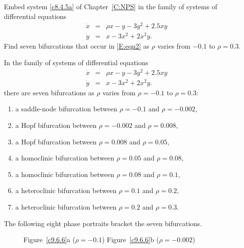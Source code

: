 \documentclass{ximera}
\begin{document}
\begin{exercise} \label{c9.6.6}
Embed system \eqref{c8.4.5a} of Chapter~\ref{C:NPS} in the family of systems of 
differential equations 
\begin{equation} \label{E:eqn2}
\begin{array}{rcl}
\dot{x} & = & \rho x-y-3y^2+2.5xy\\
\dot{y} & = & x-3x^2+2x^2y.
\end{array}
\end{equation}
Find seven bifurcations that occur in \eqref{E:eqn2} as $\rho$ varies from 
$-0.1$ to $\rho=0.3$. 

\begin{solution}

\soln In the family of systems of differential equations  
\[
\begin{array}{rcl}
\dot{x} & = & \rho x-y-3y^2+2.5xy\\
\dot{y} & = & x-3x^2+2x^2y.
\end{array}
\]
there are seven bifurcations as $\rho$ varies from $\rho=-0.1$ to $\rho=0.3$:  
\begin{enumerate}
\item	a saddle-node bifurcation between $\rho=-0.1$ and $\rho=-0.002$,
\item	a Hopf bifurcation between $\rho=-0.002$ and $\rho=0.008$,
\item	a Hopf bifurcation between $\rho=0.008$ and $\rho=0.05$,
\item	a homoclinic bifurcation between $\rho=0.05$ and $\rho=0.08$,
\item	a homoclinic bifurcation between $\rho=0.08$ and $\rho=0.1$,
\item	a heteroclinic bifurcation between $\rho=0.1$ and $\rho=0.2$,
\item	a heteroclinic bifurcation between $\rho=0.2$ and $\rho=0.3$.
\end{enumerate}
The following eight phase portraits bracket the seven bifurcations.
\begin{figure}[htb]
     \centerline{%
     }
     \centerline{Figure~\ref{c9.6.6}a ($\rho = -0.1$)\hspace{1.3in} Figure~\ref{c9.6.6}b ($\rho = -0.002$)}
\end{figure}
\begin{figure}[htb]
     \centerline{%
     }

\end{figure}
\end{solution}
\end{exercise}
\end{document}
